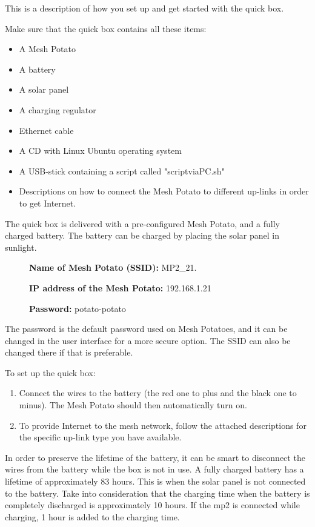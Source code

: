 This is a description of how you set up and get started with the \gls{quick} box. 

Make sure that the \gls{quick} box contains all these items: 
\begin{itemize}
\item A Mesh Potato
\item A battery
\item A solar panel
\item A charging regulator
\item Ethernet cable
\item A CD with Linux Ubuntu operating system
\item A USB-stick containing a script called "scriptviaPC.sh"
\item Descriptions on how to connect the Mesh Potato to different up-links in order to get Internet. 
\end{itemize}

The \gls{quick} box is delivered with a pre-configured Mesh Potato, and a fully charged battery. The battery can be charged by placing the solar panel in sunlight. 

\begin{description}
\item[] \textbf{Name of Mesh Potato (SSID):} MP2_21.
\item[] \textbf{IP address of the Mesh Potato:} 192.168.1.21
\item[] \textbf{Password:} potato-potato 
\end{description}

The password is the default password used on Mesh Potatoes, and it can be changed in the user interface for a more secure option. The SSID can also be changed there if that is preferable. 

To set up the \gls{quick} box: 
\begin{enumerate}
\item Connect the wires to the battery (the red one to plus and the black one to minus). The Mesh Potato should then automatically turn on. 
\item To provide Internet to the mesh network, follow the attached descriptions for the specific up-link type you have available. 
\end{enumerate} 

In order to preserve the lifetime of the battery, it can be smart to disconnect the wires from the battery while the box is not in use. A fully charged battery has a lifetime of approximately 83 hours. This is when the solar panel is not connected to the battery. Take into consideration that the charging time when the battery is completely discharged is approximately 10 hours. If the \gls{mp2} is connected while charging, 1 hour is added to the charging time. 
